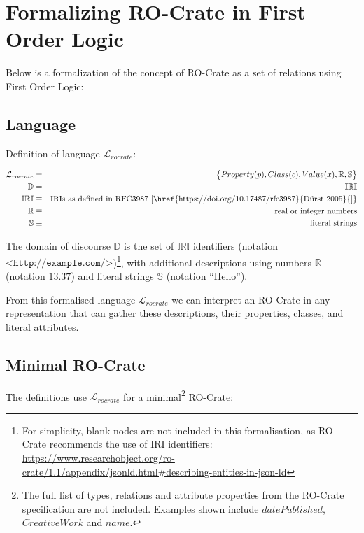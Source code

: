 \section{Formalizing RO-Crate in First Order Logic}
\label{formaldefinition}

Below is a formalization of the concept of RO-Crate as a set of relations using First Order Logic:

\subsection{Language}

Definition of language $\mathcal{L}_{rocrate}$:

\begin{eqnarray*}
    \mathcal{L}_{rocrate}   & = & \big\{ Property(p), Class(c),
                            Value(x), \mathbb{R}, \mathbb{S} \big\} \\
    \mathbb{D}              & = & \mathbb{IRI} \\
    \mathbb{IRI}            & \equiv & { \text{IRIs as defined in RFC3987 {[}\href{https://doi.org/10.17487/rfc3987}{Dürst 2005}{]}} } \\
    \mathbb{R}              & \equiv & { \text{real or integer numbers} } \\
    \mathbb{S}              & \equiv & { \text{literal strings} }
\end{eqnarray*}


The domain of discourse $\mathbb{D}$ is the set of $\mathbb{IRI}$ identifiers (notation $\texttt{<http://example.com/>}$)\footnote{
    For simplicity, blank nodes are not included in this formalisation, as RO-Crate
    recommends the use of IRI identifiers: \url{https://www.researchobject.org/ro-crate/1.1/appendix/jsonld.html\#describing-entities-in-json-ld}
}, with additional descriptions using numbers $\mathbb{R}$ (notation $13.37$) and literal strings $\mathbb{S}$ (notation $\text{“Hello”}$).

From this formalised language $\mathcal{L}_{rocrate}$ we can interpret an RO-Crate in any representation that can gather these descriptions, their properties, classes, and literal attributes.

\subsection{Minimal RO-Crate}

The definitions  use $\mathcal{L}_{rocrate}$ for a minimal\footnote{
    The full list of types, relations and attribute properties from the RO-Crate specification are not included. Examples shown include $datePublished$, $CreativeWork$ and $name$.
} RO-Crate:


